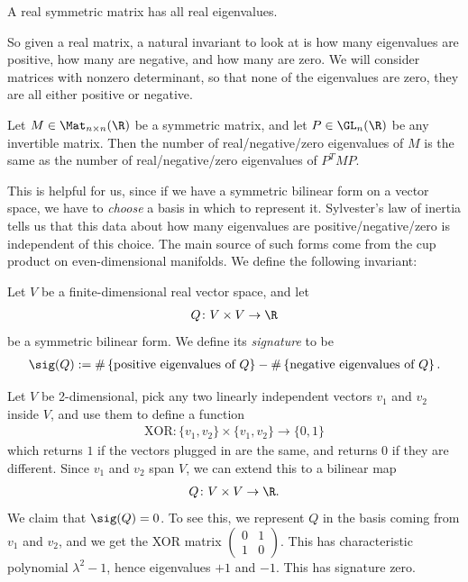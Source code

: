 \documentclass[11pt]{book}
\begin{document}
\begin{corollary} A real symmetric matrix has all real eigenvalues.
\end{corollary}

So given a real matrix, a natural invariant to look at is how many eigenvalues are positive, how many are negative, and how many are zero. We will consider matrices with nonzero determinant, so that none of the eigenvalues are zero, they are all either positive or negative.

\begin{theorem} Let $M\in \Mat_{n \times n}(\R)$ be a symmetric matrix, and let $P \in \GL_n(\R)$ be any invertible matrix. Then the number of real/negative/zero eigenvalues of $M$ is the same as the number of real/negative/zero eigenvalues of $P^T M P$.
\end{theorem}

This is helpful for us, since if we have a symmetric bilinear form on a vector space, we have to \emph{choose} a basis in which to represent it. Sylvester's law of inertia tells us that this data about how many eigenvalues are positive/negative/zero is independent of this choice. The main source of such forms come from the cup product on even-dimensional manifolds. We define the following invariant:

\begin{definition}\label{def:signature-of-symm-bilinear-form} Let $V$ be a finite-dimensional real vector space, and let
\begin{align*}
    Q \colon V \times V \to \R
\end{align*}
be a symmetric bilinear form. We define its \emph{signature} to be
\begin{align*}
    \sig(Q) := \#\left\{ \text{positive eigenvalues of }Q \right\} - \# \left\{ \text{negative eigenvalues of }Q \right\}.
\end{align*}
\end{definition}

\begin{example} Let $V$ be 2-dimensional, pick any two linearly independent vectors $v_1$ and $v_2$ inside $V$, and use them to define a function 
\begin{align*}
    \text{XOR} \colon \{v_1,v_2\} \times \{v_1,v_2\} \to \{0,1\}
\end{align*}
which returns $1$ if the vectors plugged in are the same, and returns $0$ if they are different. Since $v_1$ and $v_2$ span $V$, we can extend this to a bilinear map
\begin{align*}
    Q \colon V \times V \to \R.
\end{align*}
We claim that $\sig(Q) = 0$. To see this, we represent $Q$ in the basis coming from $v_1$ and $v_2$, and we get the XOR matrix $\begin{pmatrix} 0 & 1 \\ 1 & 0 \end{pmatrix}$. This has characteristic polynomial $\lambda^2-1$, hence eigenvalues $+1$ and $-1$. This has signature zero.
\end{example}
\end{document}
